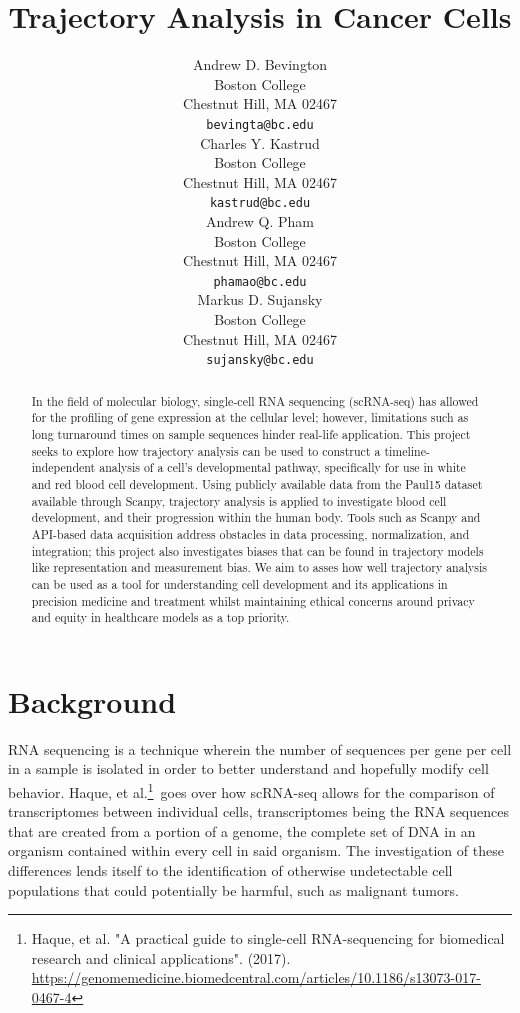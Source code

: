 \documentclass{article}
\title{Trajectory Analysis in Cancer Cells}
\author{%
  Andrew D. Bevington \\
  Boston College\\
  Chestnut Hill, MA 02467\\
  \texttt{bevingta@bc.edu} \\
  \And
  Charles Y. Kastrud \\
  Boston College\\
  Chestnut Hill, MA 02467\\
  \texttt{kastrud@bc.edu} \\
  \And
  Andrew Q. Pham \\
  Boston College\\
  Chestnut Hill, MA 02467\\
  \texttt{phamao@bc.edu} \\
  \And
  Markus D. Sujansky \\
  Boston College\\
  Chestnut Hill, MA 02467\\
  \texttt{sujansky@bc.edu} \\
}
\begin{document}
\maketitle


\begin{abstract}
  In the field of molecular biology, single-cell RNA sequencing (scRNA-seq) has allowed for the profiling of gene expression at the cellular level; however, limitations such as long turnaround times on sample sequences hinder real-life application. This project seeks to explore how trajectory analysis can be used to construct a timeline-independent analysis of a cell's developmental pathway, specifically for use in white and red blood cell development. Using publicly available data from the Paul15 dataset available through Scanpy, trajectory analysis is applied to investigate blood cell development, and their progression within the human body. Tools such as Scanpy and API-based data acquisition address obstacles in data processing, normalization, and integration; this project also investigates biases that can be found in trajectory models like representation and measurement bias. We aim to asses how well trajectory analysis can be used as a tool for understanding cell development and its applications in precision medicine and treatment whilst maintaining ethical concerns around privacy and equity in healthcare models as a top priority.
  
\end{abstract}


\section{Background}
RNA sequencing is a technique wherein the number of sequences per gene per cell in a sample is isolated in order to better understand and hopefully modify cell behavior. Haque, et al.\footnote{Haque, et al. "A practical guide to single-cell RNA-sequencing for biomedical research and clinical applications". (2017). \url{https://genomemedicine.biomedcentral.com/articles/10.1186/s13073-017-0467-4}}\ goes over how scRNA-seq allows for the comparison of transcriptomes between individual cells, transcriptomes being the RNA sequences that are created from a portion of a genome, the complete set of DNA in an organism contained within every cell in said organism. The investigation of these differences lends itself to the identification of otherwise undetectable cell populations that could potentially be harmful, such as malignant tumors.
\end{document}

